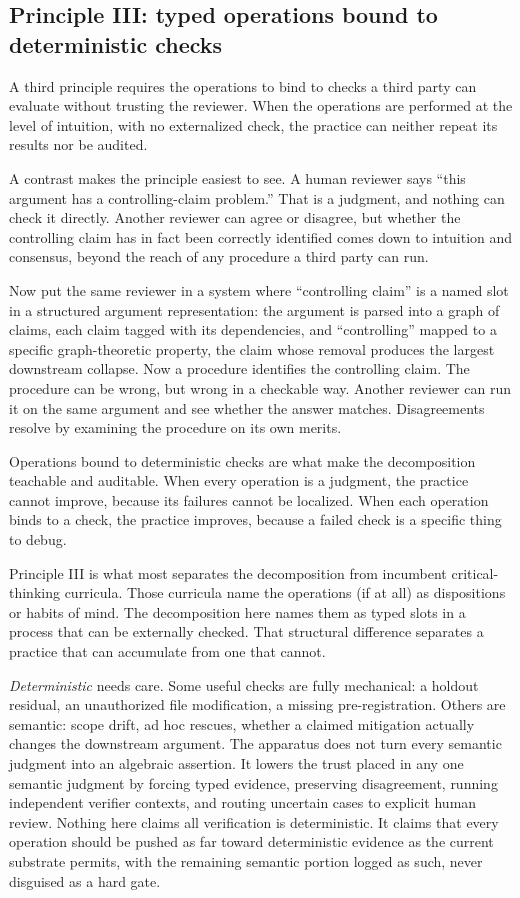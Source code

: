 \documentclass[
  11pt,
]{article}
\begin{document}
\subsection{Principle III: typed operations bound to deterministic
checks}\label{principle-iii-typed-operations-bound-to-deterministic-checks}

A third principle requires the operations to bind to checks a third party
can evaluate without trusting the reviewer. When the operations are
performed at the level of intuition, with no externalized check, the
practice can neither repeat its results nor be audited.

A contrast makes the principle easiest to see. A human reviewer says
``this argument has a controlling-claim problem.'' That is a judgment, and
nothing can check it directly. Another reviewer can agree or disagree, but
whether the controlling claim has in fact been correctly identified comes
down to intuition and consensus, beyond the reach of any procedure a third
party can run.

Now put the same reviewer in a system where ``controlling claim'' is a
named slot in a structured argument representation: the argument is parsed
into a graph of claims, each claim tagged with its dependencies, and
``controlling'' mapped to a specific graph-theoretic property, the claim
whose removal produces the largest downstream collapse. Now a procedure
identifies the controlling claim. The procedure can be wrong, but wrong in
a checkable way. Another reviewer can run it on the same argument and see
whether the answer matches. Disagreements resolve by examining the
procedure on its own merits.

Operations bound to deterministic checks are what make the decomposition
teachable and auditable. When every operation is a judgment, the practice
cannot improve, because its failures cannot be localized. When each
operation binds to a check, the practice improves, because a failed check
is a specific thing to debug.

Principle III is what most separates the decomposition from
incumbent critical-thinking curricula. Those curricula name the operations
(if at all) as dispositions or habits of mind. The decomposition here
names them as typed slots in a process that can be externally checked.
That structural difference separates a practice that can accumulate from
one that cannot.

\emph{Deterministic} needs care. Some useful checks are fully
mechanical: a holdout residual, an unauthorized file modification, a
missing pre-registration. Others are semantic: scope drift, ad hoc rescues, whether a claimed mitigation actually changes the downstream
argument. The apparatus does not turn every semantic judgment into an
algebraic assertion. It lowers the trust placed in any one semantic
judgment by forcing typed evidence, preserving disagreement, running
independent verifier contexts, and routing uncertain cases to explicit
human review. Nothing here claims all verification is deterministic. It
claims that every operation should be pushed as far toward deterministic
evidence as the current substrate permits, with the remaining semantic
portion logged as such, never disguised as a hard gate.
\end{document}
